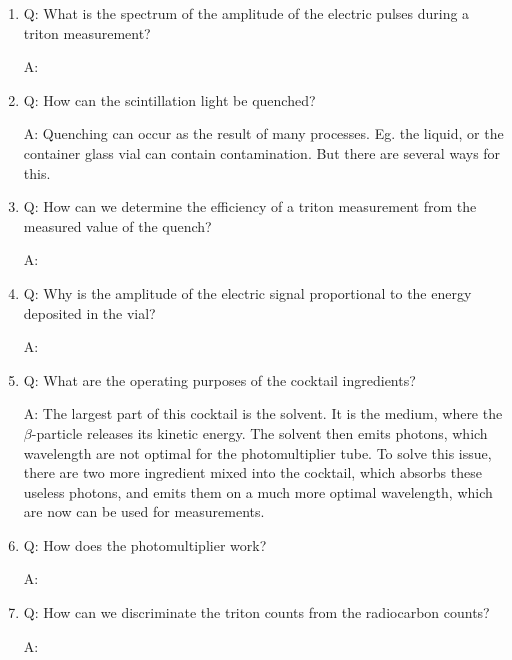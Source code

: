 \begin{enumerate}
    \item Q: What is the spectrum of the amplitude of the electric pulses during a triton
measurement?
    \begin{displayquote}
        A: 
    \end{displayquote}
    
    \item Q: How can the scintillation light be quenched?
    \begin{displayquote}
        A: Quenching can occur as the result of many processes. Eg. the liquid, or the container glass vial can contain contamination. But there are several ways for this.
    \end{displayquote}
    
    \item Q: How can we determine the efficiency of a triton measurement from the measured
value of the quench?
    \begin{displayquote}
        A: 
    \end{displayquote}
    
    \item Q: Why is the amplitude of the electric signal proportional to the energy deposited in the vial?
    \begin{displayquote}
        A: 
    \end{displayquote}
    
    \item Q: What are the operating purposes of the cocktail ingredients?
    \begin{displayquote}
        A: The largest part of this cocktail is the solvent. It is the medium, where the $\beta$-particle releases its kinetic energy. The solvent then emits photons, which wavelength are not optimal for the photomultiplier tube. To solve this issue, there are two more ingredient mixed into the cocktail, which absorbs these useless photons, and emits them on a much more optimal wavelength, which are now can be used for measurements.
    \end{displayquote}
    
    \item Q: How does the photomultiplier work?
    \begin{displayquote}
        A: 
    \end{displayquote}
    
    \item Q: How can we discriminate the triton counts from the radiocarbon counts?
    \begin{displayquote}
        A: 
    \end{displayquote}
\end{enumerate}